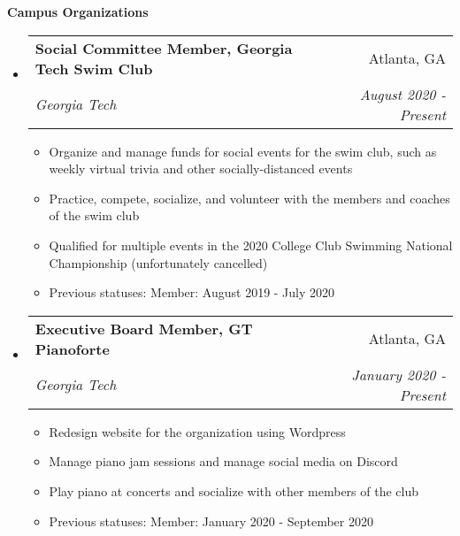 \documentclass[letterpaper,10pt]{article}
\makeatletter
\newcommand{\resitem}[1]{\item #1 \vspace{-2pt}}
\newcommand{\resheading}[1]{{\large \colorbox{mygrey}{\begin{minipage}{\textwidth}{\textbf{#1 \vphantom{p\^{E}}}}\end{minipage}}}}
\newcommand{\ressubheading}[4]{
\begin{tabular*}{7.0in}{l@{\extracolsep{\fill}}r}
		\textbf{#1} & #2 \\
		\textit{#3} & \textit{#4} \\
\end{tabular*}\vspace{-6pt}}
\makeatother
\begin{document}
\resheading{Campus Organizations}
\begin{itemize}
\item
    \ressubheading{Social Committee Member, Georgia Tech Swim Club}{Atlanta, GA}{Georgia Tech}{August 2020 - Present}
    \begin{itemize}
        \resitem{Organize and manage funds for social events for the swim club, such as weekly virtual trivia and other socially-distanced events}
        \resitem{Practice, compete, socialize, and volunteer with the members and coaches of the swim club}
        \resitem{Qualified for multiple events in the 2020 College Club Swimming National Championship (unfortunately cancelled)}
        \resitem{Previous statuses: Member: August 2019 - July 2020}
    \end{itemize}
\item
    \ressubheading{Executive Board Member, GT Pianoforte}{Atlanta, GA}{Georgia Tech}{January 2020 - Present}
    \begin{itemize}
        \resitem{Redesign website for the organization using Wordpress}
        \resitem{Manage piano jam sessions and manage social media on Discord}
        \resitem{Play piano at concerts and socialize with other members of the club}
        \resitem{Previous statuses: Member: January 2020 - September 2020}
    \end{itemize}
\end{itemize}
\end{document}
